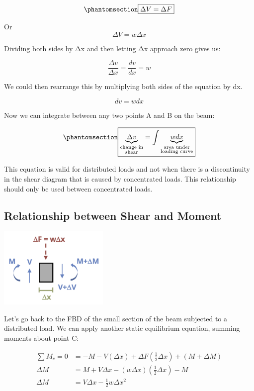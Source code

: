 \documentclass[
  letterpaper,
  DIV=11,
  numbers=noendperiod]{scrreprt}
\theoremstyle{definition}
\theoremstyle{remark}
\begin{document}
\begin{equation}\phantomsection\label{eq-7.1}{
\boxed{\Delta V=\Delta F}
}\end{equation}

Or \[
\Delta V=w\Delta x
\]

Dividing both sides by Δx and then letting Δx approach zero gives us:

\[
\frac{\Delta v}{\Delta x}=\frac{d v}{d x}=w
\]

We could then rearrange this by multiplying both sides of the equation
by dx.

\[
d v=w d x
\]

Now we can integrate between any two points A and B on the beam:

\begin{equation}\phantomsection\label{eq-7.2}{
\boxed{\underbrace{\Delta v}_{\substack{\text{change in} \\ \text{shear}}}=\int\underbrace{w d x}_{\substack{\text{area under} \\ \text {loading curve}}}}
}\end{equation}

This equation is valid for distributed loads and not when there is a
discontinuity in the shear diagram that is caused by concentrated loads.
This relationship should only be used between concentrated loads.

\subsection{Relationship between Shear and
Moment}\label{relationship-between-shear-and-moment}

\begin{center}
\includegraphics[width=2.07292in,height=\textheight]{images/CH7 PNGs/figure 7.5.png}
\end{center}

Let's go back to the FBD of the small section of the beam subjected to a
distributed load. We can apply another static equilibrium equation,
summing moments about point C:

\[
\begin{aligned}
\sum M_c=0 & =-M-V(\Delta x)+\Delta F\left(\frac{1}{2} \Delta x\right)+(M+\Delta M) \\
\Delta M & =M+V \Delta x-(w \Delta x)\left(\frac{1}{2} \Delta x\right)-M \\
\Delta M & =V \Delta x-\frac{1}{2} w \Delta x^2
\end{aligned}
\]
\end{document}
